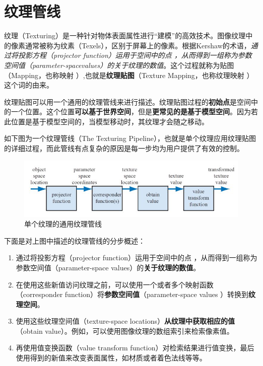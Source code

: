 \documentclass[UTF8,a4paper,12pt]{ctexbook}
\begin{document}
	\section{纹理管线}
		纹理（Texturing）是一种针对物体表面属性进行“建模”的高效技术。图像纹理中的像素通常被称为纹素（Texels），区别于屏幕上的像素。根据Kershaw的术语，\textit{通过将投影方程（projector function）运用于空间中的点 ，从而得到一组称为参数空间值（parameter-spacevalues）的关于纹理的数值}。这个过程就称为贴图（Mapping，也称映射 ）,也就是\textbf{纹理贴图}（Texture Mapping，也称纹理映射 ）这个词的由来。
		
		纹理贴图可以用一个通用的纹理管线来进行描述。纹理贴图过程的\textbf{初始点}是空间中的一个位置。这个位置\textbf{可以基于世界空间}，但是\textbf{更常见的是基于模型空间}。因为若此位置是基于模型空间的，当模型移动时，其纹理才会随之移动。
		
		如下图为一个纹理管线（The Texturing Pipeline），也就是单个纹理应用纹理贴图的详细过程，而此管线有点复杂的原因是每一步均为用户提供了有效的控制。
			\begin{figure}[H]
				\centering
				\includegraphics[scale=0.67]{TexturePipeline}
				\caption{单个纹理的通用纹理管线}
			\end{figure}
			
		下面是对上图中描述的纹理管线的分步概述：
			\begin{enumerate}[itemindent = 2em]
				\item 通过将投影方程（projector function）运用于空间中的点 ，从而得到一组称为参数空间值（parameter-space values）的\textbf{关于纹理的数值}。
				\item 在使用这些新值访问纹理之前，可以使用一个或者多个映射函数（corresponder function）将\textbf{参数空间值}（parameter-space values ）转换到\textbf{纹理空间}。
				\item 使用这些纹理空间值（texture-space locations）\textbf{从纹理中获取相应的值}（obtain value）。例如，可以使用图像纹理的数组索引来检索像素值。
				\item 再使用值变换函数（value transform function）对检索结果进行值变换，最后使用得到的新值来改变表面属性，如材质或者着色法线等等。
			\end{enumerate}
\end{document}
